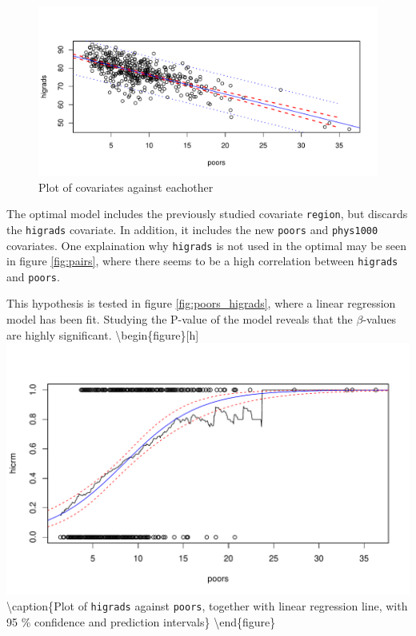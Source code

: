 \documentclass[a4paper]{article}
\begin{document}
\begin{figure}[h]
\includegraphics{Project_2_files/figure-latex/unnamed-chunk-27-1} \caption{\label{fig:pairs}Plot of covariates against eachother}\label{fig:unnamed-chunk-27}
\end{figure}

The optimal model includes the previously studied covariate
\texttt{region}, but discards the \texttt{higrads} covariate. In
addition, it includes the new \texttt{poors} and \texttt{phys1000}
covariates. One explaination why \texttt{higrads} is not used in the
optimal may be seen in figure \ref{fig:pairs}, where there seems to be a
high correlation between \texttt{higrads} and \texttt{poors}.

This hypothesis is tested in figure \ref{fig:poors_higrads}, where a
linear regression model has been fit. Studying the P-value of the model
reveals that the \(\beta\)-values are highly significant.
\textbackslash{}begin\{figure\}{[}h{]}
\includegraphics{Project_2_files/figure-latex/unnamed-chunk-28-1}
\textbackslash{}caption\{\label{fig:poors_higrads}Plot of
\texttt{higrads} against \texttt{poors}, together with linear regression
line, with 95 \% confidence and prediction
intervals\}\label{fig:unnamed-chunk-28} \textbackslash{}end\{figure\}
\end{document}
